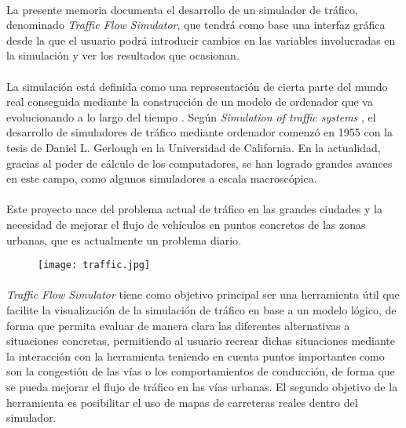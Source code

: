 \paragraph{}
La presente memoria documenta el desarrollo de un simulador de tráfico, denominado \emph{Traffic Flow Simulator}, que tendrá como base una interfaz gráfica desde la que el usuario podrá introducir cambios en las variables involucradas en la simulación y ver los resultados que ocasionan.

\paragraph{}
La simulación está definida como una representación de cierta parte del mundo real conseguida mediante la construcción de un modelo de ordenador que va evolucionando a lo largo del tiempo \cite{Drew1968}. Según \emph{Simulation of traffic systems} \cite{Pursula}, el desarrollo de simuladores de tráfico mediante ordenador comenzó en 1955 con la tesis de Daniel L. Gerlough en la Universidad de California. En la actualidad, gracias al poder de cálculo de los computadores, se han logrado grandes avances en este campo, como algunos simuladores a escala macroscópica.

\paragraph{}
Este proyecto nace del problema actual de tráfico en las grandes ciudades y la necesidad de mejorar el flujo de vehículos en puntos concretos de las zonas urbanas, que es actualmente un problema diario. 

	\begin{figure}[ht]
		\centering
			\texttt{[image: traffic.jpg]}
	\end{figure}

\paragraph{}
\emph{Traffic Flow Simulator} tiene como objetivo principal ser una herramienta útil que facilite la visualización de la simulación de tráfico en base a un modelo lógico, de forma que permita evaluar de manera clara las diferentes alternativas a situaciones concretas, permitiendo al usuario recrear dichas situaciones mediante la interacción con la herramienta teniendo en cuenta puntos importantes como son la congestión de las vías o los comportamientos de conducción, de forma que se pueda mejorar el flujo de tráfico en las vías urbanas. El segundo objetivo de la herramienta es posibilitar el uso de mapas de carreteras reales dentro del simulador.

